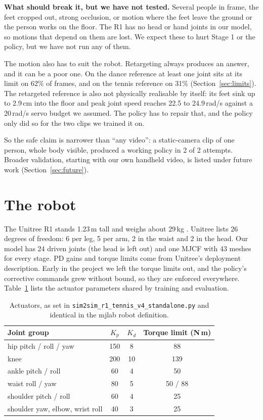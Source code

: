 \documentclass[11pt]{article}
\newcommand{\code}[1]{\texttt{#1}}
\begin{document}
\textbf{What should break it, but we have not tested.} Several people in frame, the feet cropped out, strong occlusion, or motion where the feet leave the ground or the person works on the floor. The R1 has no head or hand joints in our model, so motions that depend on them are lost. We expect these to hurt Stage 1 or the policy, but we have not run any of them.

The motion also has to suit the robot. Retargeting always produces an answer, and it can be a poor one. On the dance reference at least one joint sits at its limit on 62\% of frames, and on the tennis reference on 31\% (Section~\ref{sec:limits}). The retargeted reference is also not physically realisable by itself: its feet sink up to 2.9\,cm into the floor and peak joint speed reaches 22.5 to 24.9\,rad/s against a 20\,rad/s servo budget we assumed. The policy has to repair that, and the policy only did so for the two clips we trained it on.

So the safe claim is narrower than ``any video'': a static-camera clip of one person, whole body visible, produced a working policy in 2 of 2 attempts. Broader validation, starting with our own handheld video, is listed under future work (Section~\ref{sec:future}).

\section{The robot}
The Unitree R1 stands 1.23\,m tall and weighs about 29\,kg \cite{r1}. Unitree lists 26 degrees of freedom: 6 per leg, 5 per arm, 2 in the waist and 2 in the head. Our model has 24 driven joints (the head is left out) and one MJCF with 43 meshes for every stage. PD gains and torque limits come from Unitree's deployment description. Early in the project we left the torque limits out, and the policy's corrective commands grew without bound, so they are enforced everywhere. Table~\ref{tab:act} lists the actuator parameters shared by training and evaluation.

\begin{table}[!htbp]
\centering\small
\caption{Actuators, as set in \code{sim2sim\_r1\_tennis\_v4\_standalone.py} and identical in the mjlab robot definition.}
\label{tab:act}
\begin{tabular}{@{}lccc@{}}
\toprule
Joint group & $K_p$ & $K_d$ & Torque limit (N\,m)\\
\midrule
hip pitch / roll / yaw & 150 & 8 & 88\\
knee & 200 & 10 & 139\\
ankle pitch / roll & 60 & 4 & 50\\
waist roll / yaw & 80 & 5 & 50 / 88\\
shoulder pitch / roll & 60 & 4 & 25\\
shoulder yaw, elbow, wrist roll & 40 & 3 & 25\\
\bottomrule
\end{tabular}
\end{table}
\end{document}
